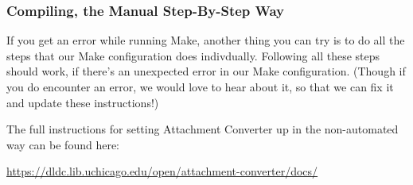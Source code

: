 \documentclass[11pt]{article}
\begin{document}
\subsubsection*{Compiling, the Manual Step-By-Step Way}
\label{sec:org21f112d}

If you get an error while running Make, another thing you can try is
to do all the steps that our Make configuration does indivdually.
Following all these steps should work, if there's an unexpected error
in our Make configuration.  (Though if you do encounter an error, we
would love to hear about it, so that we can fix it and update these
instructions!)

The full instructions for setting Attachment Converter up in the
non-automated way can be found here:

\url{https://dldc.lib.uchicago.edu/open/attachment-converter/docs/}
\end{document}
